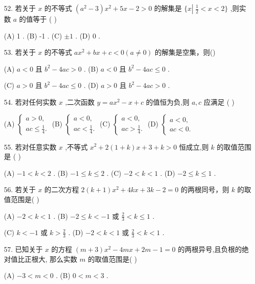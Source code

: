 \documentclass[10pt]{article}
\begin{document}
52. 若关于 \(x\) 的不等式 \(\left( {{a}^{2} - 3}\right) {x}^{2} + {5x} - 2 > 0\) 的解集是 \(\{ x\left| {\;\frac{1}{2} < x < 2}\right. \}\) ,则实数 \(a\) 的值等于 ( )

(A) 1 . (B) -1 . (C) \(\pm  1\) . (D) 0 .

53. 若关于 \(x\) 的不等式 \(a{x}^{2} + {bx} + c < 0\left( {a \neq  0}\right)\) 的解集是空集，则()

(A) \(a < 0\) 且 \({b}^{2} - {4ac} > 0\) . (B) \(a < 0\) 且 \({b}^{2} - {4ac} \leq  0\) .

(C) \(a > 0\) 且 \({b}^{2} - {4ac} \leq  0\) . (D) \(a > 0\) 且 \({b}^{2} - {4ac} > 0\) .

54. 若对任何实数 \(x\) ,二次函数 \(y = a{x}^{2} - x + c\) 的值恒为负,则 \(a,c\) 应满足 ( )

(A) \(\left\{  \begin{array}{l} a > 0, \\  {ac} \leq  \frac{1}{4}. \end{array}\right.\) (B) \(\left\{  \begin{array}{l} a < 0, \\  {ac} < \frac{1}{4}. \end{array}\right.\) (C) \(\left\{  \begin{array}{l} a < 0, \\  {ac} > \frac{1}{4}. \end{array}\right.\) (D) \(\left\{  \begin{array}{l} a < 0, \\  {ac} < 0. \end{array}\right.\)

55. 若对任意实数 \(x\) ,不等式 \({x}^{2} + 2\left( {1 + k}\right) x + 3 + k > 0\) 恒成立,则 \(k\) 的取值范围是 ( )

(A) \(- 1 < k < 2\) . (B) \(- 1 \leq  k \leq  2\) . (C) \(- 2 < k < 1\) . (D) \(- 2 \leq  k \leq  1\) .

56. 若关于 \(x\) 的二次方程 \(2\left( {k + 1}\right) {x}^{2} + {4kx} + {3k} - 2 = 0\) 的两根同号，则 \(k\) 的取值范围是( )

(A) \(- 2 < k < 1\) . (B) \(- 2 \leq  k <  - 1\) 或 \(\frac{2}{3} < k \leq  1\) .

(C) \(k <  - 1\) 或 \(k > \frac{2}{3}\) . (D) \(- 2 < k < 1\) 或 \(\frac{2}{3} < k < 1\) .

57. 已知关于 \(x\) 的方程 \(\left( {m + 3}\right) {x}^{2} - {4mx} + {2m} - 1 = 0\) 的两根异号,且负根的绝对值比正根大, 那么实数 \(m\) 的取值范围是( )

(A) \(- 3 < m < 0\) . (B) \(0 < m < 3\) .
\end{document}
